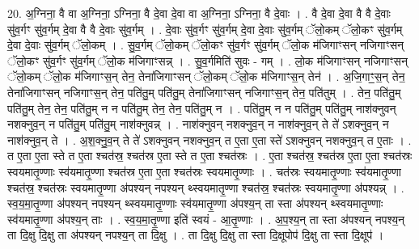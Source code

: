 \documentclass[17pt]{extarticle}
\begin{document}
20. अ॒ग्निना॒ वै वा अ॒ग्निना॒ ऽग्निना॒ वै दे॒वा दे॒वा वा अ॒ग्निना॒ ऽग्निना॒ वै दे॒वाः । . वै दे॒वा दे॒वा वै वै दे॒वाः सु॑व॒र्गꣳ सु॑व॒र्गम् दे॒वा वै वै दे॒वाः सु॑व॒र्गम् । . दे॒वाः सु॑व॒र्गꣳ सु॑व॒र्गम् दे॒वा दे॒वाः सु॑व॒र्गम् ॅलो॒कम् ॅलो॒कꣳ सु॑व॒र्गम् दे॒वा दे॒वाः सु॑व॒र्गम् ॅलो॒कम् । . सु॒व॒र्गम् ॅलो॒कम् ॅलो॒कꣳ सु॑व॒र्गꣳ सु॑व॒र्गम् ॅलो॒क म॑जिगाꣳसन् नजिगाꣳसन् ॅलो॒कꣳ सु॑व॒र्गꣳ सु॑व॒र्गम् ॅलो॒क म॑जिगाꣳसन्न् । . सु॒व॒र्गमिति॑ सुवः - गम् । . लो॒क म॑जिगाꣳसन् नजिगाꣳसन् ॅलो॒कम् ॅलो॒क म॑जिगाꣳस॒न् तेन॒ तेना॑जिगाꣳसन् ॅलो॒कम् ॅलो॒क म॑जिगाꣳस॒न् तेन॑ । . अ॒जि॒गाꣳ॒॒स॒न् तेन॒ तेना॑जिगाꣳसन् नजिगाꣳस॒न् तेन॒ पति॑तु॒म् पति॑तु॒म् तेना॑जिगाꣳसन् नजिगाꣳस॒न् तेन॒ पति॑तुम् । . तेन॒ पति॑तु॒म् पति॑तु॒म् तेन॒ तेन॒ पति॑तु॒म् न न पति॑तु॒म् तेन॒ तेन॒ पति॑तु॒म् न । . पति॑तु॒म् न न पति॑तु॒म् पति॑तु॒म् नाश॑क्नुवन् नशक्नुव॒न् न पति॑तु॒म् पति॑तु॒म् नाश॑क्नुवन्न् । . नाश॑क्नुवन् नशक्नुव॒न् न नाश॑क्नुव॒न् ते ते॑ ऽशक्नुव॒न् न नाश॑क्नुव॒न् ते । . अ॒श॒क्नु॒व॒न् ते ते॑ ऽशक्नुवन् नशक्नुव॒न् त ए॒ता ए॒ता स्ते॑ ऽशक्नुवन् नशक्नुव॒न् त ए॒ताः । . त ए॒ता ए॒ता स्ते त ए॒ता श्चत॑स्र॒ श्चत॑स्र ए॒ता स्ते त ए॒ता श्चत॑स्रः । . ए॒ता श्चत॑स्र॒ श्चत॑स्र ए॒ता ए॒ता श्चत॑स्रः स्वयमातृ॒ण्णाः स्व॑यमातृ॒ण्णा श्चत॑स्र ए॒ता ए॒ता श्चत॑स्रः स्वयमातृ॒ण्णाः । . चत॑स्रः स्वयमातृ॒ण्णाः स्व॑यमातृ॒ण्णा श्चत॑स्र॒ श्चत॑स्रः स्वयमातृ॒ण्णा अ॑पश्यन् नपश्यन् थ्स्वयमातृ॒ण्णा श्चत॑स्र॒ श्चत॑स्रः स्वयमातृ॒ण्णा अ॑पश्यन्न् । . स्व॒य॒मा॒तृ॒ण्णा अ॑पश्यन् नपश्यन् थ्स्वयमातृ॒ण्णाः स्व॑यमातृ॒ण्णा अ॑पश्य॒न् ता स्ता अ॑पश्यन् थ्स्वयमातृ॒ण्णाः स्व॑यमातृ॒ण्णा अ॑पश्य॒न् ताः । . स्व॒य॒मा॒तृ॒ण्णा इति॑ स्वयं - आ॒तृ॒ण्णाः । . अ॒प॒श्य॒न् ता स्ता अ॑पश्यन् नपश्य॒न् ता दि॒क्षु दि॒क्षु ता अ॑पश्यन् नपश्य॒न् ता दि॒क्षु । . ता दि॒क्षु दि॒क्षु ता स्ता दि॒क्षूपोप॑ दि॒क्षु ता स्ता दि॒क्षूप॑ । \newline
\end{document}
